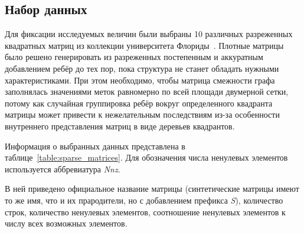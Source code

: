 \subsection{Набор данных}
Для фиксации исследуемых величин были выбраны 10 различных разреженных квадратных матриц из коллекции университета Флориды~\cite{matrixData}.
Плотные матрицы было решено генерировать из разреженных постепенным и аккуратным добавлением ребёр до тех пор, пока структура не станет обладать нужными характеристиками. При этом необходимо, чтобы матрица смежности графа заполнялась значениями меток равномерно по всей площади двумерной сетки, потому как случайная группировка ребёр вокруг определенного квадранта матрицы может привести к нежелательным последствиям из-за особенности внутреннего представления матриц в виде деревьев квадрантов.

Информация о выбранных данных представлена в таблице~\ref{table:sparse_matrices}. 
Для обозначения числа ненулевых элементов используется аббревиатура \textit{Nnz}. 

В ней приведено официальное название матрицы (синтетические матрицы имеют то же имя, что и их прародители, но с добавлением префикса \textit{S}), количество строк, количество ненулевых элементов, соотношение ненулевых элементов к числу всех возможных элементов.

\begin{table}[h]
\begin{center}
\caption{Разреженные матричные данные}
\label{table:sparse_matrices}
\end{center}
\end{table}


